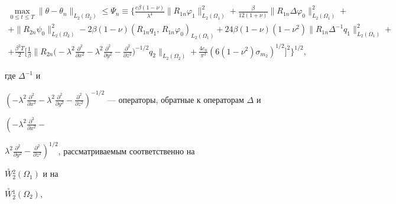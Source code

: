 \begin{multline*}


\max_{0\le t\le T}\|\theta-\theta_n\|_{L_2(\Omega_2)}\le\Psi_n


\equiv\biggl\{\frac{c\beta(1-\nu)}{\lambda^4}


\|R_{1n}\varphi_1\|^2_{L_2(\Omega_1)}+


\frac{\beta}{12(1+\nu)}\|R_{1n}\Delta\varphi_0\|^2_{L_2(\Omega_1)}+\\


%


+\|R_{2n}\psi_0\|^2_{L_2(\Omega_2)}-2\beta(1-\nu)


(R_{1n}q_1,\,R_{1n}\varphi_0)_{L_2(\Omega_1)}+


24\beta(1-\nu)(1-\nu^2)


\|R_{1n}\Delta^{-1}q_1\|^2_{L_2(\Omega_1)}+ \\


%


+\frac{\beta^2T}{2}\biggl[\frac{1}{\beta}\biggl\|R_{2n}\biggl(


-\lambda^2\frac{\partial^2}{\partial x^2}-\lambda^2


\frac{\partial^2}{\partial y^2}-\frac{\partial^2}{\partial z^2}


\biggr)^{-1/2}q_2\biggr\|_{L_2(\Omega_2)}+


\frac{4c_n}{\pi^3}(6(1-\nu^2)\sigma_{m_2})^{1/2}


\biggr]^2\biggr\}^{1/2},


\end{multline*}


где $\Delta^{-1}$ и


$\left(-\lambda^2\frac{\partial^2}{\partial x^2}-\lambda^2


\frac{\partial^2}{\partial y^2}-\frac{\partial^2}{\partial z^2}


\right)^{-1/2}$ --- операторы, обратные к операторам $\Delta$ и


$\left(-\lambda^2\frac{\partial^2}{\partial x^2}-\right.$


$\left.\lambda^2


\frac{\partial^2}{\partial y^2}-\frac{\partial^2}{\partial z^2}


\right)^{1/2}$, рассматриваемым соответственно на


$\overset{\circ}{W}{}^2_2(\Omega_1)$ и на


$\overset{\circ}{W}{}^1_2(\Omega_2)$,


